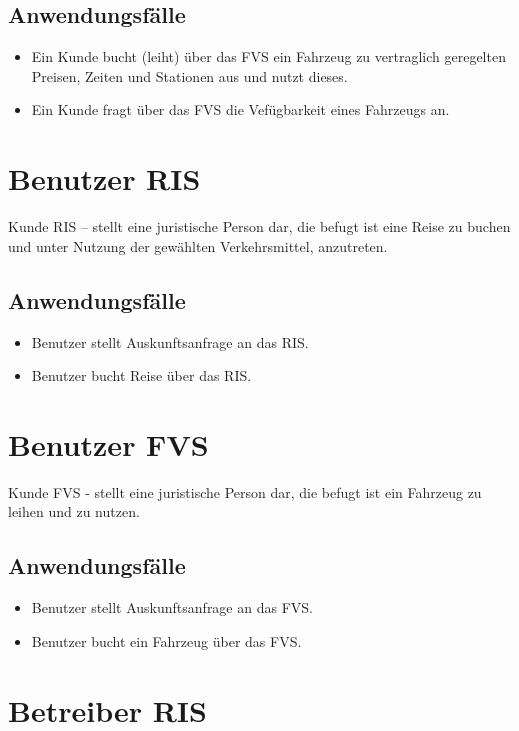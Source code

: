 \subsection*{Anwendungsfälle}
\begin{itemize}
\item Ein Kunde bucht (leiht) über das FVS ein Fahrzeug zu vertraglich geregelten Preisen, Zeiten und Stationen aus und nutzt dieses.
\item Ein Kunde fragt über das FVS die Vefügbarkeit eines Fahrzeugs an. 
\end{itemize}

\section{Benutzer RIS}

Kunde RIS – stellt eine juristische Person dar, die befugt ist eine Reise zu buchen und unter Nutzung der gewählten Verkehrsmittel, anzutreten. 

\subsection*{Anwendungsfälle}
\begin{itemize}
\item Benutzer stellt Auskunftsanfrage an das RIS.
\item Benutzer bucht Reise über das RIS.
\end{itemize}

\section{Benutzer FVS}

Kunde FVS  - stellt eine juristische Person dar, die befugt ist ein Fahrzeug zu leihen und zu nutzen.

\subsection*{Anwendungsfälle}
\begin{itemize}
\item Benutzer stellt Auskunftsanfrage an das FVS.
\item Benutzer bucht ein Fahrzeug über das FVS.
\end{itemize}

\section{Betreiber RIS}

